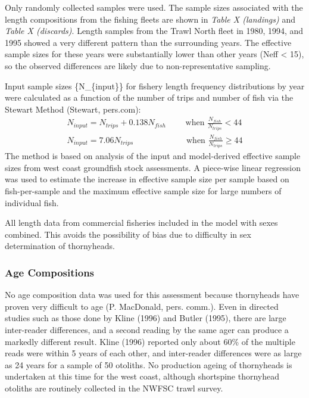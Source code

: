 \documentclass[11pt,
  english,
  letterpaper,
]{article}
\begin{document}
Only randomly collected samples were used. The sample sizes associated with the length compositions from the fishing fleets are shown in \emph{\emph{Table X (landings)}} and \emph{\emph{Table X (discards)}}. Length samples from the Trawl North fleet in 1980, 1994, and 1995 showed a very different pattern than the surrounding years. The effective sample sizes for these years were substantially lower than other years (Neff \textless{} 15), so the observed differences are likely due to non-representative sampling.

Input sample sizes \{N\_\{input\}\} for fishery length frequency distributions by year were calculated as a function of the number of trips and number of fish via the Stewart Method (Stewart, pers.com): \begin{align*}{N_{input} = N_{trips} + 0.138N_{fish}}\qquad\text{ when }\frac{N_{fish}}{N_{trips}}<44 \\
{N_{input} = 7.06N_{trips}}\qquad\qquad\qquad\text{ when }\frac{N_{fish}}{N_{trips}}\ge 44 \end{align*} The method is based on analysis of the input and model-derived effective sample sizes from west coast groundfish stock assessments. A piece-wise linear regression was used to estimate the increase in effective sample size per sample based on fish-per-sample and the maximum effective sample size for large numbers of individual fish.

All length data from commercial fisheries included in the model with sexes combined. This avoids the possibility of bias due to difficulty in sex determination of thornyheads.

\hypertarget{age-compositions}{%
\subsubsection{Age Compositions}\label{age-compositions}}

No age composition data was used for this assessment because thornyheads have proven very difficult to age (P. MacDonald, pers. comm.). Even in directed studies such as those done by Kline (1996) and Butler (1995), there are large inter-reader differences, and a second reading by the same ager can produce a markedly different result. Kline (1996) reported only about 60\% of the multiple reads were within 5 years of each other, and inter-reader differences were as large as 24 years for a sample of 50 otoliths. No production ageing of thornyheads is undertaken at this time for the west coast, although shortspine thornyhead otoliths are routinely collected in the NWFSC trawl survey.
\end{document}
